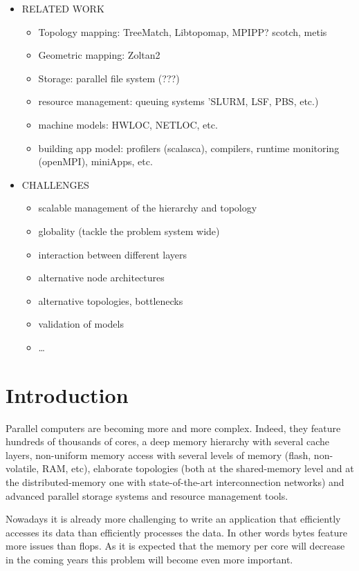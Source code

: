 \begin{itemize}
\item RELATED WORK

\begin{itemize}
\item Topology mapping: TreeMatch, Libtopomap, MPIPP? scotch, metis  
\item Geometric mapping: Zoltan2
\item Storage: parallel file system (???)
\item resource management: queuing systems 'SLURM, LSF, PBS, etc.)
\item machine models: HWLOC, NETLOC, etc. 
\item building app model: profilers (scalasca), compilers, runtime monitoring (openMPI), 
miniApps, etc. 
\end{itemize}

\item CHALLENGES

\begin{itemize}
\item scalable management of the hierarchy and topology
\item globality (tackle the problem system wide)
\item interaction between different layers
\item alternative node architectures
\item alternative topologies, bottlenecks
\item validation of models
\item \ldots
\end{itemize}

\end{itemize}

\section{Introduction}
 

Parallel computers are becoming more and more complex. 
Indeed, they feature hundreds of thousands of cores, a deep memory hierarchy with 
several cache layers, non-uniform memory access with  several levels of memory (flash,
non-volatile, RAM, etc), elaborate topologies (both at the
shared-memory level and at the distributed-memory one with state-of-the-art
interconnection networks) and advanced parallel storage systems and resource
management tools.

Nowadays it is already more challenging to write an application that efficiently
accesses its data than efficiently processes the data. In other words bytes 
feature more issues than flops. As it is expected that the memory
per core will decrease in the coming years this problem will become even
more important. 

